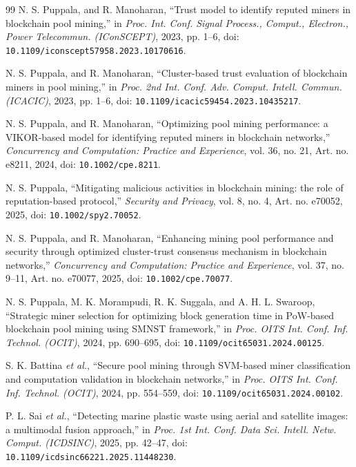 \documentclass[conference]{IEEEtran}
\begin{document}
\begin{thebibliography}{99}
N. S. Puppala, and R. Manoharan, ``Trust model to identify reputed miners in blockchain pool mining,'' in \textit{Proc. Int. Conf. Signal Process., Comput., Electron., Power Telecommun. (IConSCEPT)}, 2023, pp. 1--6, doi: \nolinkurl{10.1109/iconscept57958.2023.10170616}.

N. S. Puppala, and R. Manoharan, ``Cluster-based trust evaluation of blockchain miners in pool mining,'' in \textit{Proc. 2nd Int. Conf. Adv. Comput. Intell. Commun. (ICACIC)}, 2023, pp. 1--6, doi: \nolinkurl{10.1109/icacic59454.2023.10435217}.

N. S. Puppala, and R. Manoharan, ``Optimizing pool mining performance: a VIKOR-based model for identifying reputed miners in blockchain networks,'' \textit{Concurrency and Computation: Practice and Experience}, vol. 36, no. 21, Art. no. e8211, 2024, doi: \nolinkurl{10.1002/cpe.8211}.

N. S. Puppala, ``Mitigating malicious activities in blockchain mining: the role of reputation-based protocol,'' \textit{Security and Privacy}, vol. 8, no. 4, Art. no. e70052, 2025, doi: \nolinkurl{10.1002/spy2.70052}.

N. S. Puppala, and R. Manoharan, ``Enhancing mining pool performance and security through optimized cluster-trust consensus mechanism in blockchain networks,'' \textit{Concurrency and Computation: Practice and Experience}, vol. 37, no. 9--11, Art. no. e70077, 2025, doi: \nolinkurl{10.1002/cpe.70077}.

N. S. Puppala, M. K. Morampudi, R. K. Suggala, and A. H. L. Swaroop, ``Strategic miner selection for optimizing block generation time in PoW-based blockchain pool mining using SMNST framework,'' in \textit{Proc. OITS Int. Conf. Inf. Technol. (OCIT)}, 2024, pp. 690--695, doi: \nolinkurl{10.1109/ocit65031.2024.00125}.

S. K. Battina \textit{et al.}, ``Secure pool mining through SVM-based miner classification and computation validation in blockchain networks,'' in \textit{Proc. OITS Int. Conf. Inf. Technol. (OCIT)}, 2024, pp. 554--559, doi: \nolinkurl{10.1109/ocit65031.2024.00102}.

P. L. Sai \textit{et al.}, ``Detecting marine plastic waste using aerial and satellite images: a multimodal fusion approach,'' in \textit{Proc. 1st Int. Conf. Data Sci. Intell. Netw. Comput. (ICDSINC)}, 2025, pp. 42--47, doi: \nolinkurl{10.1109/icdsinc66221.2025.11448230}.


\end{thebibliography}
\end{document}
